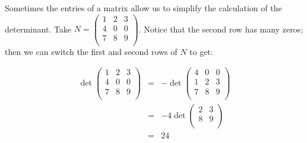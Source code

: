 \begin{example}
Sometimes the entries of a matrix allow us to simplify the calculation of the determinant.  Take $N= \begin{pmatrix}
1 & 2 & 3 \\
4 & 0 & 0 \\
7 & 8 & 9 \\
\end{pmatrix}$.  Notice that the second row has many zeros; then we can switch the first and second rows of $N$ to get:

\begin{eqnarray*}
\det \begin{pmatrix}
1 & 2 & 3 \\
4 & 0 & 0 \\
7 & 8 & 9 \\
\end{pmatrix} & = & -\det \begin{pmatrix}
4 & 0 & 0 \\
1 & 2 & 3 \\
7 & 8 & 9 \\
\end{pmatrix}\\
&=& -4 \det \begin{pmatrix}
2 & 3 \\
8 & 9 \\
\end{pmatrix} \\
&=& 24
\end{eqnarray*}
\end{example}
 

